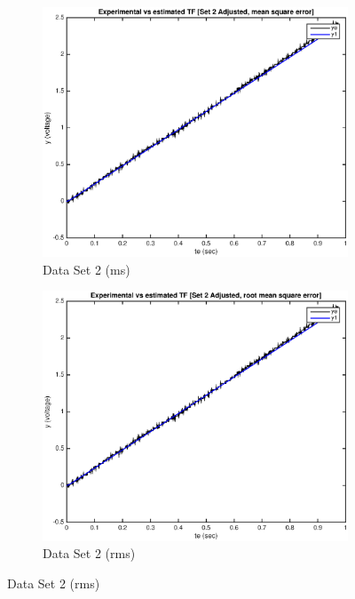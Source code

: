 \documentclass[11pt,a4paper]{article}
\begin{document}
\begin{enumerate}
\begin{figure}[H]
  
  \begin{subfigure}{0.5\textwidth}
   \includegraphics[width=0.9\linewidth]{Matlab_Figures/y1_dataset2_ms.eps} 
   \caption{Data Set 2 (ms)}
   \label{fig:subim1}
   \end{subfigure}
   \begin{subfigure}{0.5\textwidth}
   \includegraphics[width=0.9\linewidth]{Matlab_Figures/y1_dataset2_rms.eps}
   \caption{Data Set 2 (rms)}
   \label{fig:subim2}
   \end{subfigure}
  

\end{figure}
\end{enumerate}
\end{document}
